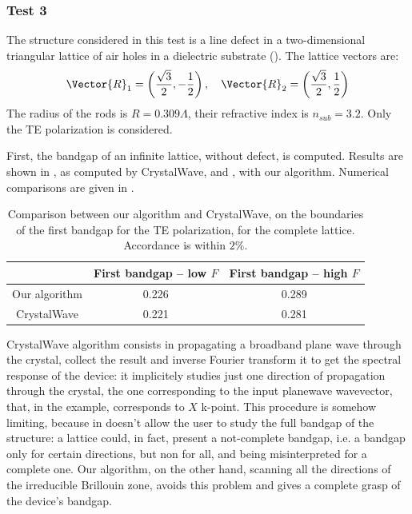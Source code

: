 \subsubsection{Test 3}

The structure considered in this test is a line defect in a two-dimensional 
triangular lattice of air holes in a dielectric substrate
(). The lattice vectors are:
\begin{equation*}
  \Vector{R}_1 = \left( \frac{\sqrt{3}}{2}, -\frac{1}{2} \right),
  \quad \Vector{R}_2 = \left( \frac{\sqrt{3}}{2}, \frac{1}{2} \right)
\end{equation*}
The radius of the rods is $R = 0.309 \Lambda$, their refractive index is
$n_{sub} = 3.2$. Only the TE polarization is considered.

First, the bandgap of an infinite lattice, without defect, is
computed. Results are shown in , as computed by
CrystalWave, and , with our
algorithm. Numerical comparisons are given in .

\begin{table}[htbp]
  \begin{center}
    \begin{tabular}{|*{3}{c|}}
      \hline
      & First bandgap -- low $F$ & First bandgap -- high $F$ \\
      \hline
      Our algorithm & 0.226 & 0.289 \\
      CrystalWave & 0.221 & 0.281 \\
      \hline
    \end{tabular}
  \end{center}
  \caption{Comparison between our algorithm and CrystalWave, on the
  boundaries of the first bandgap for the TE polarization, for the
  complete lattice. Accordance is within $2\%$.}
  \label{tab:test_3}
\end{table}

CrystalWave algorithm consists in propagating a broadband
plane wave through the crystal, collect the result and inverse Fourier
transform it to get the spectral response of the device: it implicitely
studies just one direction of propagation through the crystal, the one
corresponding to the input planewave wavevector, that, in the example,
corresponds to $X$ k-point. This procedure is somehow limiting,
because in doesn't allow the user to study the full bandgap of the
structure: a lattice could, in fact, present a not-complete bandgap, i.e. a bandgap only for
certain directions, but non for all, and being misinterpreted for a
complete one. Our algorithm, on the other hand, scanning all the
directions of the irreducible Brillouin zone, avoids this problem and
gives a complete grasp of the device's bandgap.


